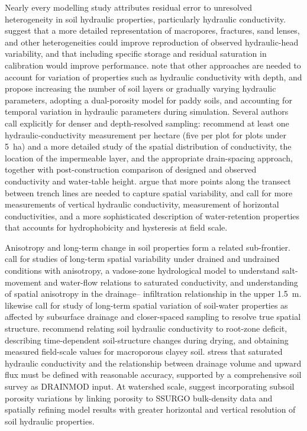 Nearly every modelling study attributes residual error to unresolved
heterogeneity in soil hydraulic properties, particularly hydraulic
conductivity. \textcite{DeSchepper2017} suggest that a more detailed
representation of macropores, fractures, sand lenses, and other
heterogeneities could improve reproduction of observed hydraulic-head
variability, and that including specific storage and residual saturation in
calibration would improve performance. \textcite{Wesström2003} note that other
approaches are needed to account for variation of properties such as hydraulic
conductivity with depth, and \textcite{Karandish2018} propose increasing the
number of soil layers or gradually varying hydraulic parameters, adopting a
dual-porosity model for paddy soils, and accounting for temporal variation in
hydraulic parameters during simulation. Several authors call explicitly for
denser and depth-resolved sampling: \textcite{PalaciosVélez2004} recommend at
least one hydraulic-conductivity measurement per hectare (five per plot for
plots under 5~ha) and a more detailed study of the spatial distribution of
conductivity, the location of the impermeable layer, and the appropriate
drain-spacing approach, together with post-construction comparison of designed
and observed conductivity and water-table height. \textcite{Messing2006} argue
that more points along the transect between trench lines are needed to capture
spatial variability, and \textcite{Tähtikarhu2025} call for more measurements
of vertical hydraulic conductivity, measurement of horizontal conductivities,
and a more sophisticated description of water-retention properties that
accounts for hydrophobicity and hysteresis at field scale.

Anisotropy and long-term change in soil properties form a related sub-frontier.
\textcite{Akis2015} call for studies of long-term spatial variability under
drained and undrained conditions with anisotropy, a vadose-zone hydrological
model to understand salt-movement and water-flow relations to saturated
conductivity, and understanding of spatial anisotropy in the drainage--
infiltration relationship in the upper 1.5~m. \textcite{Moustafa1998} likewise
call for study of long-term spatial variation of soil-water properties as
affected by subsurface drainage and closer-spaced sampling to resolve true
spatial structure. \textcite{Koivusalo1999} recommend relating soil hydraulic
conductivity to root-zone deficit, describing time-dependent soil-structure
changes during drying, and obtaining measured field-scale values for
macroporous clayey soil. \textcite{DeBoer2006} stress that saturated hydraulic
conductivity and the relationship between drainage volume and upward flux must
be defined with reasonable accuracy, supported by a comprehensive soil survey
as DRAINMOD input. At watershed scale, \textcite{Schilling2015} suggest
incorporating subsoil porosity variations by linking porosity to SSURGO
bulk-density data and spatially refining model results with greater horizontal
and vertical resolution of soil hydraulic properties.


